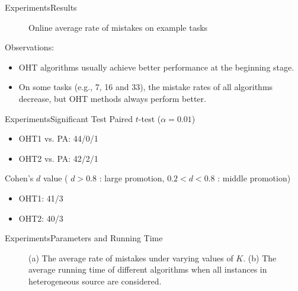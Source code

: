 \documentclass{beamer}
\begin{document}
\begin{frame}{Experiments}{Results}
\begin{figure}
{  }
  \caption{Online average rate of mistakes on example tasks}
  \label{Online average rate of mistakes on example tasks}
\end{figure}
Observations:
\begin{itemize}
\item
OHT algorithms usually achieve better performance at the beginning stage.
\item
On some tasks (e.g., 7, 16 and 33), the mistake rates of all algorithms decrease, but OHT methods always perform better.
\end{itemize}
\end{frame}

\begin{frame}{Experiments}{Significant Test}
Paired $t$-test ($\alpha = 0.01$)
\begin{itemize}
\item
OHT1 vs. PA: 44/0/1
\item
OHT2 vs. PA: 42/2/1
\end{itemize}
Cohen's $d$ value ( $d > 0.8$ : large promotion, $0.2 < d < 0.8$ : middle promotion)
\begin{itemize}
\item
OHT1: 41/3 
\item
OHT2: 40/3
\end{itemize}
\end{frame}

\begin{frame}{Experiments}{Parameters and Running Time}
\begin{figure}
\centering
  \caption{(a) The average rate of mistakes under varying values of $K$. (b) The average running time of different algorithms when all instances in heterogeneous source are considered.}
  \label{average eok}
\end{figure}
\end{frame}
\end{document}
